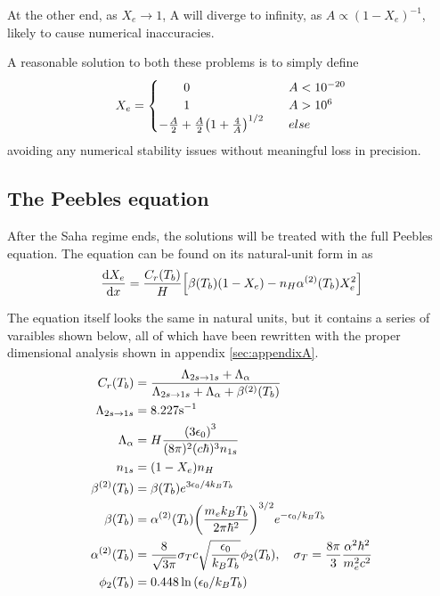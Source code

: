 \documentclass[10pt, a4paper]{article}
\begin{document}
At the other end, as $X_e \rightarrow 1$, A will diverge to infinity, as $A \propto (1 - X_e)^{-1}$, likely to cause numerical inaccuracies.

A reasonable solution \cite{Grandma} to both these problems is to simply define
\begin{equation}\label{eqn:Saha_sol2}
    X_e =
    \begin{cases}
        \quad\quad 0& \quad A < 10^{-20} \\
        \quad\quad 1& \quad A > 10^6 \\
        - \frac{A}{2} + \frac{A}{2}\qty(1 + \frac{4}{A})^{1/2}& \quad else
     \end{cases}    
\end{equation}
avoiding any numerical stability issues without meaningful loss in precision.


\subsection{The Peebles equation}\label{sec:Peebles}
After the Saha regime ends, the solutions will be treated with the full Peebles equation. The equation can be found on its natural-unit form in \cite[p. 71]{ModernCosmology2003} as
\begin{equation}
    \label{eqn:Peebles}
    \dv{X_{e}}{x}=\frac{C_{r}\qty(T_{b})}{H}\qty[\beta\qty(T_{b})\qty(1-X_{e})-n_{H} \alpha^{(2)}\qty(T_{b}) X_{e}^{2}]
\end{equation}

The equation itself looks the same in natural units, but it contains a series of varaibles shown below, all of which have been rewritten with the proper dimensional analysis shown in appendix \ref{sec:appendixA}.
\begin{align}
    \label{eqn:1x}
    C_{r}\qty(T_{b}) &=\frac{\Lambda_{2 s \rightarrow 1 s}+\Lambda_{\alpha}}{\Lambda_{2 s \rightarrow 1 s}+\Lambda_{\alpha}+\beta^{(2)}\qty(T_{b})} \\
    \label{eqn:2x}
    \Lambda_{2 s \rightarrow 1 s} &=8.227 \mathrm{s}^{-1} \\
    \label{eqn:4x}
    \Lambda_{\alpha} &= H \frac{\qty(3 \epsilon_{0})^{3}}{(8 \pi)^{2} (c\hbar)^3 n_{1 s}} \\
    \label{eqn:5x}
    n_{1 s} &=\qty(1-X_{e}) n_{H} \\
    \label{eqn:6x}
    \beta^{(2)}\qty(T_{b}) &=\beta\qty(T_{b}) e^{3 \epsilon_{0} / 4 k_B T_{b}} \\
    \label{eqn:7x}
    \beta\qty(T_{b}) &= \alpha^{(2)}\qty(T_{b}) \qty(\frac{m_{e} k_B T_{b}}{2 \pi \hbar^2})^{3 / 2} e^{-\epsilon_{0} / k_BT_{b}} \\
    \label{eqn:8x}
    \alpha^{(2)}\qty(T_{b}) &= \frac{8}{\sqrt{3 \pi}} \sigma_T c \sqrt{\frac{\epsilon_{0}}{k_B T_{b}}} \phi_{2}\qty(T_{b}), \quad \sigma_{T}=\frac{8 \pi}{3} \frac{\alpha^{2} \hbar^{2}}{m_{e}^{2} c^{2}} \\
    \label{eqn:9x}
    \phi_{2}\qty(T_{b}) &=0.448 \ln \qty(\epsilon_{0} / k_B T_{b})
\end{align}
\end{document}
